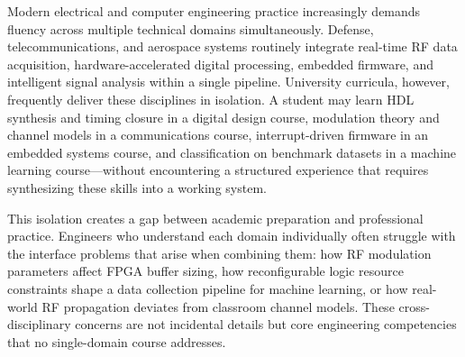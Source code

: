 \documentclass[conference]{IEEEtran}
\begin{document}
Modern electrical and computer engineering practice increasingly demands fluency across multiple technical domains simultaneously. Defense, telecommunications, and aerospace systems routinely integrate real-time RF data acquisition, hardware-accelerated digital processing, embedded firmware, and intelligent signal analysis within a single pipeline. University curricula, however, frequently deliver these disciplines in isolation. A student may learn HDL synthesis and timing closure in a digital design course, modulation theory and channel models in a communications course, interrupt-driven firmware in an embedded systems course, and classification on benchmark datasets in a machine learning course—without encountering a structured experience that requires synthesizing these skills into a working system.

This isolation creates a gap between academic preparation and professional practice. Engineers who understand each domain individually often struggle with the interface problems that arise when combining them: how RF modulation parameters affect FPGA buffer sizing, how reconfigurable logic resource constraints shape a data collection pipeline for machine learning, or how real-world RF propagation deviates from classroom channel models. These cross-disciplinary concerns are not incidental details but core engineering competencies that no single-domain course addresses.
\end{document}

